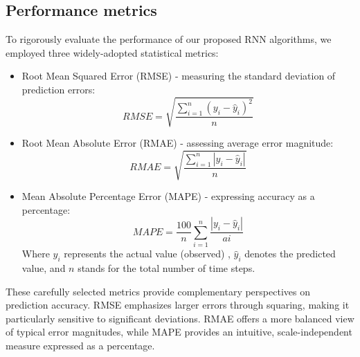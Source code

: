 \documentclass{dsfe}
\begin{document}
\subsection{Performance metrics}
To rigorously evaluate the performance of our proposed RNN algorithms, we employed three widely-adopted statistical metrics:
\begin{itemize}
\item Root Mean Squared Error (RMSE) - measuring the standard deviation of prediction errors:
\begin{equation}
RMSE = \sqrt{\dfrac{\displaystyle{\sum_{i=1}^n \left(y_i-\widehat{y}_i\right)^2}}{n} }
\end{equation}
\item Root Mean Absolute Error (RMAE) - assessing average error magnitude:
\begin{equation}
RMAE =\sqrt{\dfrac{\displaystyle{\sum_{i=1}^n} \left|y_i-\widehat{y}_i\right| }{n } } 
\end{equation}
\item Mean Absolute Percentage Error (MAPE) - expressing accuracy as a percentage:
\begin{equation}
MAPE = \dfrac{100}{n}\sum_{i=1}^n \dfrac{|y_i-\widehat{y}_i|}{ai}
\end{equation} 
Where \(y_i\) represents the  actual value (observed) , \(\widehat{y}_i\) denotes the predicted value, and \(n\) stands for the total number of time steps.
\end{itemize}
These carefully selected metrics provide complementary perspectives on prediction accuracy. RMSE emphasizes larger errors through squaring, making it particularly sensitive to significant deviations. RMAE offers a more balanced view of typical error magnitudes, while MAPE provides an intuitive, scale-independent measure expressed as a percentage.
\end{document}
